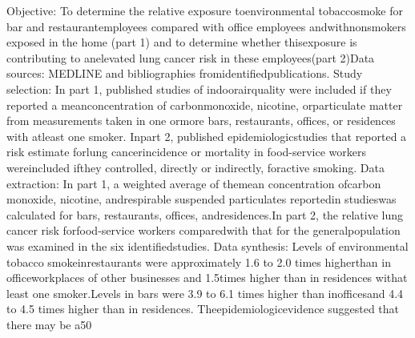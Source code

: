 Objective:    To  determine  the  relative  exposure  toenvironmental  tobaccosmoke  for  bar  and  restaurantemployees compared with office employees andwithnonsmokers  exposed  in  the  home  (part  1)  and  to determine whether thisexposure is contributing to anelevated lung cancer risk in these employees(part 2)Data  sources:  MEDLINE  and  bibliographies  fromidentifiedpublications.
Study selection: 
In part 1, published studies of indoorairquality  were  included  if  they  reported  a  meanconcentration  of  carbonmonoxide,  nicotine,  orparticulate matter from measurements taken in one ormore  bars,  restaurants,  offices,  or  residences  with  atleast  one  smoker.  
Inpart  2,  published  epidemiologicstudies  that  reported  a  risk  estimate  forlung  cancerincidence  or  mortality  in  food-service  workers  wereincluded  ifthey  controlled,  directly  or  indirectly,  foractive smoking.
Data extraction: In part 1, a weighted average of themean concentration ofcarbon monoxide, nicotine, andrespirable  suspended  particulates  reportedin  studieswas  calculated  for  bars,  restaurants,  offices,  andresidences.In part 2, the relative lung cancer risk forfood-service workers comparedwith that for the generalpopulation was examined in the six identifiedstudies.
Data synthesis: Levels of environmental tobacco smokeinrestaurants were approximately 1.6 to 2.0 times higherthan in officeworkplaces of other businesses and 1.5times higher than in residences withat least one smoker.Levels in bars were 3.9 to 6.1 times higher than inofficesand  4.4  to  4.5  times  higher  than  in  residences.  Theepidemiologicevidence suggested that there may be a50%

